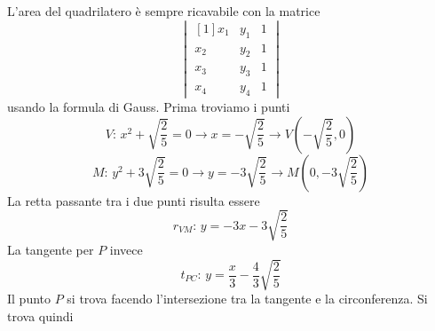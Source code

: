 \begin{center}
\end{center}
L'area del quadrilatero è sempre ricavabile con la matrice
\begin{equation*}
  \begin{vmatrix}[1]
    x_1 & y_1 & 1\\
    x_2 & y_2 & 1\\
    x_3 & y_3 & 1\\
    x_4 & y_4 & 1
  \end{vmatrix}
\end{equation*}
usando la formula di Gauss. Prima troviamo i punti
\begin{equation*}
  V:\, x^2+\sqrt{\frac{2}{5}}=0 \rightarrow x = -\sqrt{\frac{2}{5}} \rightarrow 
  V\left(-\sqrt{\frac{2}{5}},0\right)
\end{equation*}
\begin{equation*}
  M:\,y^2+3\sqrt{\frac{2}{5}}=0 \rightarrow y = -3\sqrt{\frac{2}{5}} \rightarrow 
  M\left(0,-3\sqrt{\frac{2}{5}}\right)
\end{equation*}
La retta passante tra i due punti risulta essere
\begin{equation*}
  r_{VM}:\,y=-3x-3\sqrt{\frac{2}{5}}
\end{equation*}
La tangente per $P$ invece
\begin{equation*}
  t_{PC}:\,y=\frac{x}{3}-\frac{4}{3}\sqrt{\frac{2}{5}}
\end{equation*}
Il punto $P$ si trova facendo l'intersezione tra la tangente e la circonferenza. Si trova quindi
